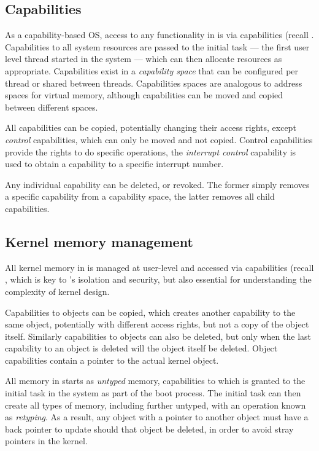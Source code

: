 \subsection{Capabilities}

As a capability-based \gls{OS}, access to any functionality in \selfour is via capabilities (recall
. Capabilities to all system resources are passed to the initial task --- the first
user level thread started in the system --- which can then allocate resources as appropriate.
Capabilities exist in a \emph{capability space} that can be configured per thread or shared between
threads. Capabilities spaces are analogous to address spaces for virtual memory, although
capabilities can be moved and copied between different spaces. 

All capabilities can be copied, potentially changing their access rights, except \emph{control}
capabilities, which can only be moved and not copied. Control capabilities provide the rights to do
specific operations, \eg the \emph{interrupt control} capability is used to obtain a capability
to a specific interrupt number.

Any individual capability can be deleted, or revoked. The former simply removes a specific
capability from a capability space, the latter removes all child capabilities.


\subsection{Kernel memory management}

All kernel memory in \selfour is managed at user-level and accessed via capabilities (recall
, which is key to \selfour's isolation and security, but also essential for
understanding the complexity of kernel design.

Capabilities to objects can be copied, which creates another capability to the same object,
potentially with different access rights, but not
a copy of the object itself. 
Similarly capabilities to objects can also be deleted, but only when the last capability to an
object is deleted will the object itself be deleted. Object capabilities contain a pointer to the
actual kernel object. 

All memory in \selfour starts as \emph{untyped} memory, capabilities to which is granted to the
initial task in the system as part of the boot process. The initial task can then create all
types of memory, including further untyped, with an operation known as \emph{retyping}. As a result,
any object with a pointer to another object must have a back pointer to update should that object be
deleted, in order to avoid stray pointers in the kernel. 

